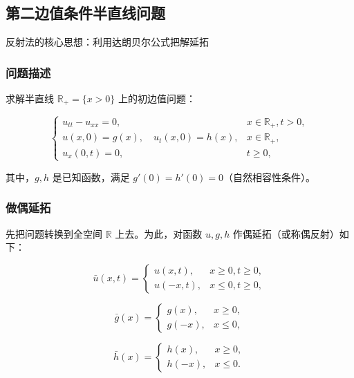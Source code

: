 \documentclass[12pt,a4paper]{article}
\numberwithin{subsection}{section}   %
\numberwithin{subsubsection}{subsection}
\theoremstyle{plain}
\theoremstyle{definition}
\theoremstyle{remark}
\theoremstyle{remark}
\begin{document}
	
		\subsection{第二边值条件半直线问题}
		反射法的核心思想：利用达朗贝尔公式把解延拓
		
		\subsubsection{问题描述}
		求解半直线 \(\mathbb{R}_+ = \{x > 0\}\) 上的初边值问题：
		
		\begin{equation}
			\begin{cases}
				u_{tt} - u_{xx} = 0, & x \in \mathbb{R}_+, t > 0, \\
				u(x, 0) = g(x), \quad u_t(x, 0) = h(x), & x \in \mathbb{R}_+, \\
				u_x(0, t) = 0, & t \geq 0,
			\end{cases}
		\end{equation}
		
		其中，\(g, h\) 是已知函数，满足 \(g'(0) = h'(0) = 0\)（自然相容性条件）。
		
		\subsubsection{做偶延拓}
		先把问题转换到全空间 \(\mathbb{R}\) 上去。为此，对函数 \(u, g, h\) 作偶延拓（或称偶反射）如下：
		
		\begin{equation}
			\bar{u}(x, t) = \begin{cases}
				u(x, t), & x \geq 0, t \geq 0, \\
				u(-x, t), & x \leq 0, t \geq 0,
			\end{cases}
		\end{equation}
		
		\begin{equation}
			\bar{g}(x) = \begin{cases}
				g(x), & x \geq 0, \\
				g(-x), & x \leq 0,
			\end{cases}
		\end{equation}
		
		\begin{equation}
			\bar{h}(x) = \begin{cases}
				h(x), & x \geq 0, \\
				h(-x), & x \leq 0.
			\end{cases}
		\end{equation}
		
\end{document}
